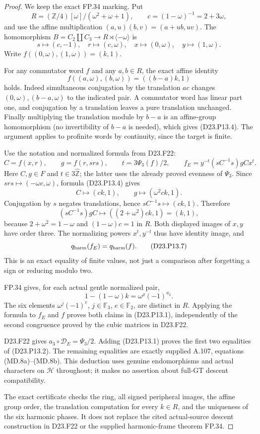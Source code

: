 \begin{proof}
We keep the exact FP.34 marking. Put
\[
 R=(\mathbb Z/4)[\omega]/(\omega^2+\omega+1),\qquad
 c=(1-\omega)^{-1}=2+3\omega,
\]
and use the affine multiplication $(a,u)(b,v)=(a+ub,uv)$.
The homomorphism $B=C_2\amalg C_3\to R\rtimes\langle-\omega\rangle$
is
\[
 s\longmapsto(c,-1),\quad r\longmapsto(c,\omega),\quad
 x\longmapsto(0,\omega),\quad y\longmapsto(1,\omega).
\tag{D23.P13.3}
\]
Write $f((0,\omega),(1,\omega))=(k,1)$.

For any commutator word $f$ and any $a,b\in R$, the exact
affine identity
\[
 f((a,\omega),(b,\omega))=((b-a)k,1)
\tag{D23.P13.4}
\]
holds. Indeed simultaneous conjugation by the translation
$ac$ changes $(0,\omega),(b-a,\omega)$ to the indicated
pair. A commutator word has linear part one, and conjugation
by a translation leaves a pure translation unchanged.
Finally multiplying the translation module by $b-a$ is an
affine-group homomorphism (no invertibility of $b-a$ is needed),
which gives (D23.P13.4). The argument applies to profinite
words by continuity, since the target is finite.

Use the notation and normalized formula from D23.F22:
\[
 C=f(x,r),\qquad g=f(r,srs),\qquad t=3\Psi_3(f)/2,
 \qquad f_E=y^{-t}(sC^{-1}s)gCx^t.
\tag{D23.P13.5}
\]
Here $C,g\in F$ and $t\in3\widehat{\mathbb Z}$; the latter
uses the already proved evenness of $\Psi_3$.
Since $srs\mapsto(-\omega c,\omega)$, formula (D23.P13.4) gives
\[
 C\longmapsto(ck,1),\qquad
 g\longmapsto(\omega^2ck,1).
\tag{D23.P13.6}
\]
Conjugation by $s$ negates translations, hence
$sC^{-1}s\mapsto(ck,1)$. Therefore
\[
 (sC^{-1}s)gC\longmapsto((2+\omega^2)ck,1)=(k,1),
\]
because $2+\omega^2=1-\omega$ and $(1-\omega)c=1$ in $R$.
Both displayed images of $x,y$ have order three. The normalizing
powers $x^t,y^{-t}$ thus have identity image, and
\[
                    q_{\rm harm}(f_E)=q_{\rm harm}(f).
\tag{D23.P13.7}
\]
This is an exact equality of finite values, not just a comparison
after forgetting a sign or reducing modulo two.

FP.34 gives, for each actual gentle normalized pair,
\[
 1-(1-\omega)k=\omega^\rho(-1)^{a_2}.
\]
The six elements $\omega^j(-1)^e$, $j\in\mathbb F_3$,
$e\in\mathbb F_2$, are distinct in $R$. Applying the formula
to $f_E$ and $f$ proves both claims in (D23.P13.1), independently
of the second congruence proved by the cubic matrices in D23.F22.

D23.F22 gives $a_3\circ\mathcal D_E=\Psi_3/2$. Adding
(D23.P13.1) proves the first two equalities of (D23.P13.2).
The remaining equalities are exactly supplied A.107, equations
(MD.8a)--(MD.8b). This deduction uses genuine endomorphisms
and actual characters on $\mathcal H$ throughout; it makes
no assertion about full-GT descent compatibility.

The exact certificate 
checks the ring, all signed peripheral images, the affine group
order, the translation computation for every $k\in R$, and
the uniqueness of the six harmonic phases. It does not replace
the cited actual-source descent construction in D23.F22 or the
supplied harmonic-frame theorem FP.34.
\end{proof}

